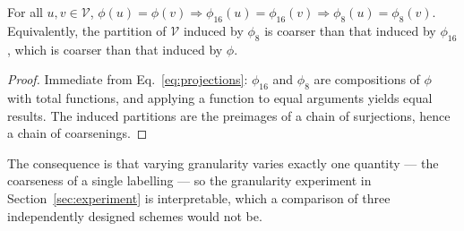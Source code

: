 \begin{proposition}[Nesting]
\label{prop:nesting}
For all $u, v \in \mathcal{V}$, $\phi(u) = \phi(v) \Rightarrow \phi_{16}(u) =
\phi_{16}(v) \Rightarrow \phi_{8}(u) = \phi_{8}(v)$. Equivalently, the
partition of $\mathcal{V}$ induced by $\phi_8$ is coarser than that induced by
$\phi_{16}$, which is coarser than that induced by $\phi$.
\end{proposition}

\begin{proof}
Immediate from Eq.~\eqref{eq:projections}: $\phi_{16}$ and $\phi_8$ are
compositions of $\phi$ with total functions, and applying a function to equal
arguments yields equal results. The induced partitions are the preimages of a
chain of surjections, hence a chain of coarsenings.
\end{proof}

The consequence is that varying granularity varies exactly one quantity --- the
coarseness of a single labelling --- so the granularity experiment in
Section~\ref{sec:experiment} is interpretable, which a comparison of three
independently designed schemes would not be.

\begin{table}[t]
\centering
\caption{The $|\mathcal{T}_8| = 8$ operation alphabet and the
$\mathcal{T}_{32}$ classes each abstracts. $\bot$ (\texttt{UNKNOWN}) labels
nodes with no operation semantics: declarations, identifiers, literals,
punctuation.}
\label{tab:taxonomy}
\end{table}

